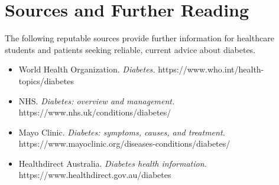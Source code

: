 \section*{Sources and Further Reading}
The following reputable sources provide further information for healthcare students and patients seeking reliable, current advice about diabetes.
\begin{itemize}
    \item World Health Organization. \textit{Diabetes.} https://www.who.int/health-topics/diabetes
    \item NHS. \textit{Diabetes: overview and management.} https://www.nhs.uk/conditions/diabetes/
    \item Mayo Clinic. \textit{Diabetes: symptoms, causes, and treatment.} https://www.mayoclinic.org/diseases-conditions/diabetes/
    \item Healthdirect Australia. \textit{Diabetes health information.} https://www.healthdirect.gov.au/diabetes
\end{itemize}
